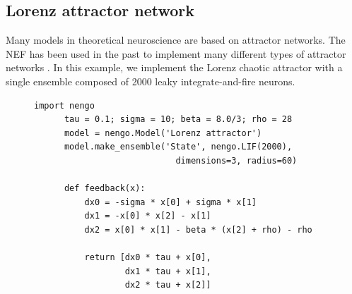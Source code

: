 \documentclass{frontiersSCNS}
\begin{document}
\subsection{Lorenz attractor network}

Many models in theoretical neuroscience
are based on attractor networks.
The NEF has been used in the past
to implement many different types of
attractor networks \cite{TODO}.
In this example,
we implement the Lorenz chaotic attractor
with a single ensemble
composed of 2000 leaky integrate-and-fire neurons.

\begin{figure}
\begin{center}
  \begin{minipage}{0.43\textwidth}
    \begin{lstlisting}[basicstyle={\footnotesize\ttfamily}]
      import nengo
      tau = 0.1; sigma = 10; beta = 8.0/3; rho = 28
      model = nengo.Model('Lorenz attractor')
      model.make_ensemble('State', nengo.LIF(2000),
                            dimensions=3, radius=60)

      def feedback(x):
          dx0 = -sigma * x[0] + sigma * x[1]
          dx1 = -x[0] * x[2] - x[1]
          dx2 = x[0] * x[1] - beta * (x[2] + rho) - rho

          return [dx0 * tau + x[0],
                  dx1 * tau + x[1],
                  dx2 * tau + x[2]]


\end{lstlisting}
\end{minipage}
\end{center}
\end{figure}
\end{document}

